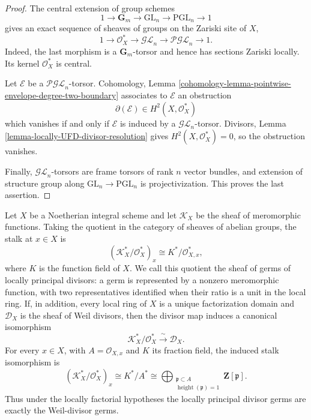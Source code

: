 \begin{proof}
The central extension of group schemes
\[
1\longrightarrow\mathbf G_m\longrightarrow\mathrm{GL}_n
\longrightarrow\mathrm{PGL}_n\longrightarrow1
\]
gives an exact sequence of sheaves of groups on the Zariski site of $X$,
\[
1\longrightarrow\mathcal O_X^*\longrightarrow\mathcal{GL}_n
\longrightarrow\mathcal{PGL}_n\longrightarrow1.
\]
Indeed, the last morphism is a $\mathbf G_m$-torsor and hence has sections
Zariski locally. Its kernel $\mathcal O_X^*$ is central.

Let $\mathcal E$ be a $\mathcal{PGL}_n$-torsor. Cohomology, Lemma
\ref{cohomology-lemma-pointwise-envelope-degree-two-boundary} associates to
$\mathcal E$ an obstruction
\[
\partial(\mathcal E)\in H^2(X,\mathcal O_X^*)
\]
which vanishes if and only if $\mathcal E$ is induced by a
$\mathcal{GL}_n$-torsor. Divisors, Lemma
\ref{lemma-locally-UFD-divisor-resolution} gives
$H^2(X,\mathcal O_X^*)=0$, so the obstruction vanishes.

Finally, $\mathcal{GL}_n$-torsors are frame torsors of rank $n$ vector
bundles, and extension of structure group along
$\mathrm{GL}_n\to\mathrm{PGL}_n$ is projectivization. This proves the last
assertion.
\end{proof}

\begin{lemma}
\label{lemma-meromorphic-quotient-divisor-germs}
\begin{reference}
\cite[Chapter III, \S 3.4, p. 160]{Tohoku}
\end{reference}
Let $X$ be a Noetherian integral scheme and let $\mathcal{K}_X$ be the
sheaf of meromorphic functions. Taking the quotient in the category of
sheaves of abelian groups, the stalk at $x \in X$ is
\[
(\mathcal{K}_X^*/\mathcal{O}_X^*)_x
\cong K^*/\mathcal{O}_{X,x}^*,
\]
where $K$ is the function field of $X$. We call this quotient the sheaf of
germs of locally principal divisors: a germ is represented by a nonzero
meromorphic function, with two representatives identified when their ratio
is a unit in the local ring. If, in addition, every local ring of $X$ is a
unique factorization domain and $\mathcal{D}_X$ is the sheaf of Weil
divisors, then the divisor map induces a canonical isomorphism
\begin{equation}
\label{equation-meromorphic-quotient-divisor-germs}
\mathcal{K}_X^*/\mathcal{O}_X^*
\xrightarrow{\ \sim\ }
\mathcal{D}_X.
\end{equation}
For every $x \in X$, with $A = \mathcal{O}_{X,x}$ and $K$ its fraction
field, the induced stalk isomorphism is
\[
(\mathcal{K}_X^*/\mathcal{O}_X^*)_x
\cong K^*/A^*
\cong
\bigoplus_{\substack{\mathfrak p \subset A\\
\operatorname{height}(\mathfrak p)=1}}
\mathbf Z[\mathfrak p].
\]
Thus under the locally factorial hypotheses the locally principal divisor
germs are exactly the Weil-divisor germs.
\end{lemma}

